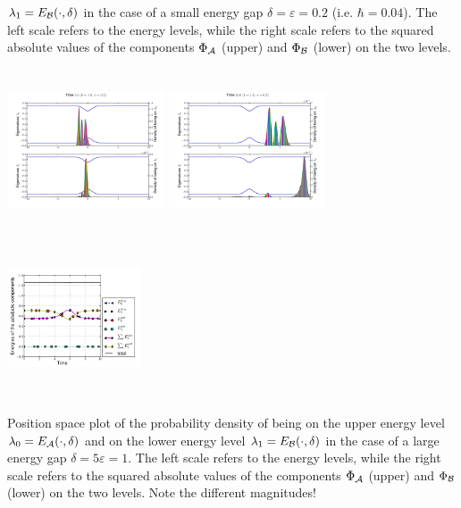 \documentclass[b0paper,portrait,fontscale=0.24]{baposter}
\begin{document}
\begin{poster}
{{      $\lambda_{1} = E_{\cal B}(\cdot,\delta)$ in the case of a small energy gap
      $\delta=\varepsilon=0.2$ (i.e. $\hbar = 0.04$). The left scale refers to the energy
      levels, while the right scale refers to the squared absolute values of the components
      $\Phi_{\cal A}$ (upper) and $\Phi_{\cal B}$ (lower) on the two levels.}
    \centerline{
      \includegraphics[width=0.35\textwidth,height=13em]{ParametersHeps0_2d5_0eS2PotAndWwave00250.pdf}
      \includegraphics[width=0.35\textwidth,height=13em]{ParametersHeps0_2d5_0eS2PotAndWwave00500.pdf}
      \includegraphics[width=0.3\textwidth,height=13em]{ParametersHeps0_2d5_0eS2energies.pdf}
    }
    { Position space plot  of the probability density of being on the upper energy level
      $\lambda_{0} = E_{\cal A}(\cdot,\delta)$ and on the lower energy level
      $\lambda_{1} = E_{\cal B}(\cdot,\delta)$ in the case of a large energy gap
      $\delta=5\varepsilon=1$. The left scale refers to the energy levels, while the right
      scale refers to the squared absolute values of the components $\Phi_{\cal A}$ (upper)
      and $\Phi_{\cal B}$ (lower) on the two levels. Note the different magnitudes!}
  }

\end{poster}
\end{document}
